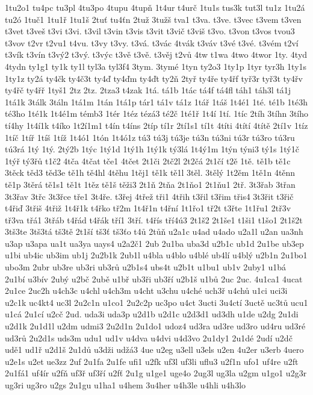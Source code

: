 1tu2o1
tu4pc
tu3pl
4tu3po
4tupu
4tupň
1t4ur
t4urč
1tu1s
tus3k
tut3l
tu1z
1tu2á
tu2ó
1tuč1
1tu1ř
1tu1š
2tuť
tu4ťn
2tuž
3tužš
tva1
t3va.
t3ve.
t3vec
t3vem
t3ven
t3vet
t3veš
t3vi
t3vi.
t3vil
t3vin
t3vis
t3vit
t3vič
t3viš
t3vo.
t3von
t3vos
tvou3
t3vov
t2vr
t2vu1
t4vu.
t3vy
t3vy.
t3vá.
t3vác
4tvák
t3váv
t3vé
t3vé.
t3vém
t2ví
t3vík
t3vín
t3vý2
t3vý.
t3výc
t3vě
t3vě.
t3věj
t2vů
4tw
t1wa
4two
4twor
1ty.
4tyd
4tydn
ty1g1
ty1k
ty1l
tyl3a
tyl3f4
3tym.
3tymé
1tyn
ty2o3
1ty1p
1tyr
tyr3h
1ty1s
1ty1z
ty2á
ty4čk
ty4č3t
ty4ď
ty4ďm
ty4ďt
ty2ň
2tyř
ty4ře
ty4řf
tyř3r
tyř3t
ty4řv
ty4řč
ty4řř
1tyš1
2tz
2tz.
2tza3
t4zak
1tá.
tá1b
1tác
tá4f
tá4fl
táh1
táh3l
tá1j
1tá1k
3tálk
3táln
1tá1m
1tán
1tá1p
tár1
tá1v
tá1z
1tář
1táš
1t4é1
1té.
té1b
1té3h
té3ho
1té1k
1t4é1m
témb3
1tér
1téz
tézá3
té2č
1té1ř
1t4í
1tí.
1tíc
2tíh
3tíhn
3tího
tí4hy
1t4í1k
t4íko
1t2í1m1
t4ín
t4íns
2típ
tí1r
2tí1s1
tí1t
4títi
4títí
4títě
2tí1v
1tíz
1tíč
1tíř
1tíš
1tíž
1t4ó1
1tón
1t4ó1z
tú3
tú3j
tú3je
tú3n
tú3ni
tú3r
tú3ro
tú3ru
tú3rá
1tý
1tý.
2tý2b
1týc
1tý1d
1tý1h
1tý1k
tý3lá
1t4ý1m
1týn
týni3
tý1s
1tý1č
1týř
tý3řů
t1č2
4tča
4tčat
tče1
4tčet
2t1či
2tč2l
2t2čá
2t1čí
t2ě
1tě.
tě1b
tě1c
3těck
těd3
těd3e
tě1h
tě4hl
4těhu
1těj1
tě1k
tě1l
3těl.
3tělý
1t2ěm
1tě1n
4těnn
tě1p
3těrá
tě1s1
tě1t
1těz
tě1š
těži3
2t1ň
2tňa
2t1ňo1
2t1ňu1
2tř.
3t3řab
3třan
3t3řav
3třc
3t3řce
tře1
3t4ře.
t3řej
4třež
tři1
4třih
t3řil
t3řim
třis4
3t3řit
t3řič
t4řiď
3třiš
4třiž
1t4ř1k
t4řko
tř2m
1t4ř1n
t4řní
1t1řo1
tř2t
t3řte
1t1řu1
2tř3v
tř3va
třá1
3třáb
t4řád
t4řák
tří1
3tří.
t4řís
tří4ú3
2t1š2
2t1še1
t1ši1
t1šo1
2t1š2t
3tš3te
3tš3tá
tš3tě
2t1ší
tš3ť
tš3ťo
t4ů
2tůň
u2a1c
u4ad
u4ado
u2a1l
u2an
ua3nh
u3ap
u3apa
ua1t
ua3ya
uays4
u2a2č1
2ub
2u1ba
uba3d
u2b1c
ub1d
2u1be
ub3ep
u1bi
ub4ic
ub3im
ub1j
2u2b1k
2ub1l
u4bla
u4blo
u4blé
ub4lí
u4blý
u2b1n
2u1bo1
ubo3m
2ubr
ub3re
ub3ri
ub3rů
u2b1s4
ubs4t
u2b1t
u1bu1
ub1v
2uby1
u1bá
2u1bí
u3bív
2ubý
u2bč
2ubě
u1bř
ub3ři
ub3ří
u2b1š
u1bů
2uc
2uc.
4u1ca1
4ucat
2u1ce
2uc2h
u4ch3c
u4chl
u4ch3m
u4cht
u3chu
u4ché
uch3ř
u4chů
u1ci
uci3i
u2c1k
uc4kt4
uc3l
2u2c1n
u1co1
2u2c2p
uc3po
u4ct
3ucti
3u4ctí
3uctě
uc3tů
ucu1
u1cá
2u1cí
u2cč
2ud.
uda3i
uda3p
u2d1b
u2d1c
u2d3d1
ud3dh
u1de
u2dg
2u1di
u2d1k
2u1d1l
u2dm
udmi3
2u2d1n
2u1do1
udoz4
ud3ra
ud3re
ud3ro
ud4ru
ud3ré
ud3rů
2u2d1s
uds3m
udu1
ud1v
u4dva
u4dvi
u4d3vo
2u1dy1
2u1dé
2udí
u2dč
udě1
ud1ř
u2d1š
2u1dů
u3dži
udžá3
4ue
u2eg
u3ell
u3els
u2en
4u2er
u3erb
4uero
u2e1s
u2et
ue3zz
2uf
2u1fa
2u1fe
ufi1
u2fk
uf3l
uf3li
uflu3
u2f1n
ufo1
uf4re
u2ft
2u1fá1
uf4ír
u2fň
uf3ř
uf3ří
u2fť
2u1g
u1ge1
uge4o
2ug3l
ug3la
u2gm
u1go1
u2g3r
ug3ri
ug3ro
u2gs
2u1gu
u1ha1
u4hem
3u4her
u4h3le
u4hli
u4h3lo
